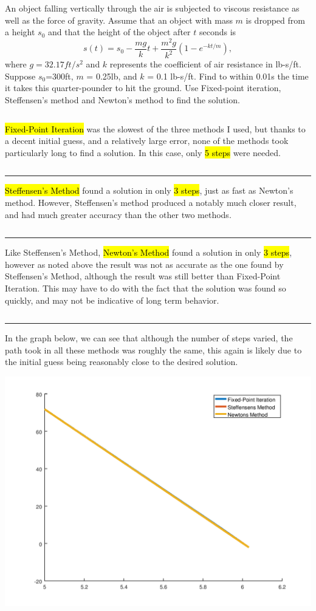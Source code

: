 \documentclass[10pt]{jhwhw}
\begin{document}
\problem{}

	An object falling vertically through the air is subjected to viscous resistance as well as the
	force of gravity. Assume that an object with mass $m$ is dropped from a height $s_0$ and that the height of the
	object after $t$ seconds is
	$$
		s(t) = s_0 - \frac{mg}{k}t + \frac{m^2g}{k^2}(1-e^{-kt/m}),
	$$
	where $g=32.17 ft/s^2$ and $k$ represents the coefficient of air resistance in lb-s/ft.
	Suppose $s_0$=300ft, $m$ = 0.25lb, and $k$ = 0.1 lb-s/ft. Find to within 0.01s the time it takes
	this quarter-pounder to hit the ground. Use Fixed-point iteration, Steffensen's method and Newton's method
	to find the solution.

\solution
	\inputminted{octave}{p7.m}
	\hl{Fixed-Point Iteration} was the slowest of the three methods I used, but thanks
	to a decent initial guess, and a relatively large error, none of the methods took
	particularly long to find a solution. In this case, only \hl{5 steps} were needed.
	\inputminted{text}{p7.fixedpoint}
	\textcolor[RGB]{240,240,240}{\rule{\textwidth}{0.5pt}}\bigbreak

	\hl{Steffensen's Method} found a solution in only \hl{3 steps}, just as fast as 
	Newton's method. However, Steffensen's method produced a notably much closer
	result, and had much greater accuracy than the other two methods.
	\inputminted{text}{p7.steffensens}
	\textcolor[RGB]{240,240,240}{\rule{\textwidth}{0.5pt}}\bigbreak

	Like Steffensen's Method, \hl{Newton's Method} found a solution in only
	\hl{3 steps}, however as noted above the result was not as accurate as the one
	found by Steffensen's Method, although the result was still better than
	Fixed-Point Iteration. This may have to do with the fact that the solution was
	found so quickly, and may not be indicative of long term behavior.
	\inputminted{text}{p7.newtons}
	\textcolor[RGB]{240,240,240}{\rule{\textwidth}{0.5pt}}\bigbreak
	
	In the graph below, we can see that although the number of steps varied,
	the path took in all these methods was roughly the same, this again is likely due to
	the initial guess being reasonably close to the desired solution.
	\begin{center}
		\includegraphics[scale=0.75]{p7.png}
	\end{center}
\end{document}
